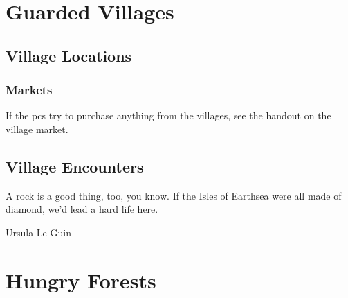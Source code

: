 \documentclass[a4paper,openany]{book}
\begin{document}
\stopcontents[Town]

\stopcontents[sq]

\chapter{Guarded Villages}

\section{Village Locations}

\begin{multicols}{2}

\subsection{Markets}

If the \glspl{pc} try to purchase anything from the villages, see the handout on the village market.







\end{multicols}

\section{Village Encounters}


\epigraph{A rock is a good thing, too, you know. If the Isles of Earthsea were all made of diamond, we'd lead a hard life here.}{Ursula Le Guin}

\renewcommand{\sqarea}{Villages}

\begin{multicols}{2}









\stopcontents[Villages]

\end{multicols}

\chapter{Hungry Forests}





\label{lastpage}

\backmatter

\printglossary[type=symbols]

\printglossary

\printindex
\end{document}
